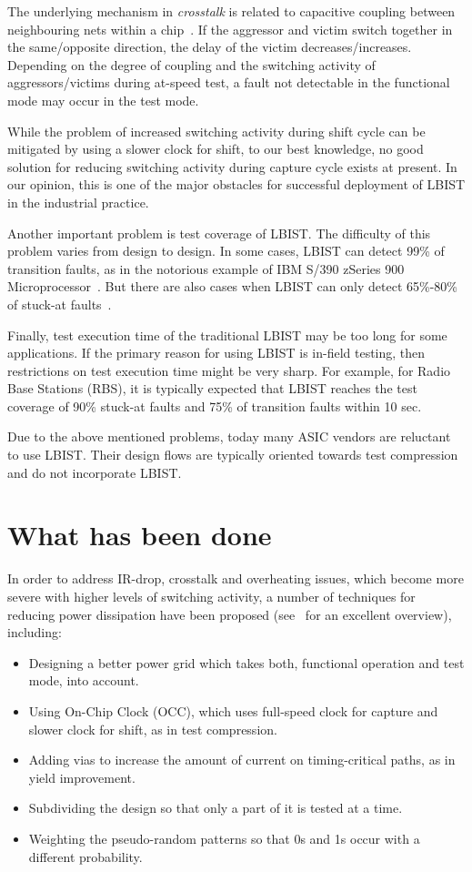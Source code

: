 \documentclass[conference]{IEEEtran}
\begin{document}
The underlying mechanism in {\em crosstalk} is related to capacitive coupling between neighbouring nets within a chip~\cite{Sa03}. If the aggressor and victim switch together in the same/opposite direction, the delay of the victim decreases/increases. Depending on the degree of coupling and the switching activity of aggressors/victims during at-speed test, a fault not detectable in the functional mode may occur in the test mode.

While the problem of increased switching activity during shift cycle can be mitigated 
by using a slower clock for shift, to our best knowledge, no good solution for reducing switching 
activity during capture cycle exists at present. In our opinion, this is one of the major 
obstacles for successful deployment of LBIST in the industrial practice.

Another important problem is test coverage of LBIST.
The difficulty of this problem varies from design to design. 
In some cases, LBIST can detect 99\% of transition faults, 
as in the notorious example of IBM S/390 zSeries 900 Microprocessor~\cite{Ku01}.
But there are also cases when LBIST can only detect 65\%-80\% of stuck-at faults~\cite{DaT00}. 

Finally, test execution time of the traditional LBIST may be too long for some applications. 
If the primary reason for using LBIST is in-field testing, then restrictions on test execution time might be very sharp. For example, for Radio Base Stations (RBS), it is typically expected that LBIST reaches the test coverage of 90\% stuck-at faults and 75\% of transition faults within 10 sec. 

Due to the above mentioned problems, today many ASIC vendors are reluctant to use LBIST. Their design flows are typically oriented towards test compression and do not incorporate LBIST. 

\section{What has been done} \label{prev}

In order to address IR-drop, crosstalk and overheating issues,
which become more severe with higher levels of switching activity, 
a number of techniques for reducing power dissipation have been proposed (see~\cite{GoC09} for an excellent overview), including:
\begin{itemize}
\item Designing a better power grid which takes both, functional operation and test mode, into account.
\item Using On-Chip Clock (OCC), which uses full-speed clock for capture and slower clock for shift, as in test compression. 
\item Adding vias to increase the amount of current on timing-critical paths, as in yield improvement.
\item Subdividing the design so that only a part of it is tested at a time.
\item Weighting the pseudo-random patterns so that 0s and 1s occur with a different probability.
\end{itemize}
\end{document}
